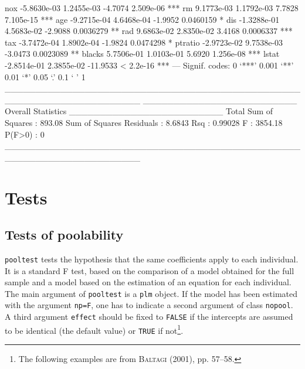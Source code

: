 \documentclass{article}
\begin{document}
\begin{Schunk}
\begin{Soutput}
nox         -5.8630e-03  1.2455e-03  -4.7074 2.509e-06 ***
rm           9.1773e-03  1.1792e-03   7.7828 7.105e-15 ***
age         -9.2715e-04  4.6468e-04  -1.9952 0.0460159 *  
dis         -1.3288e-01  4.5683e-02  -2.9088 0.0036279 ** 
rad          9.6863e-02  2.8350e-02   3.4168 0.0006337 ***
tax         -3.7472e-04  1.8902e-04  -1.9824 0.0474298 *  
ptratio     -2.9723e-02  9.7538e-03  -3.0473 0.0023089 ** 
blacks       5.7506e-01  1.0103e-01   5.6920 1.256e-08 ***
lstat       -2.8514e-01  2.3855e-02 -11.9533 < 2.2e-16 ***
---
Signif. codes:  0 ‘***’ 0.001 ‘**’ 0.01 ‘*’ 0.05 ‘.’ 0.1 ‘ ’ 1 
______________________________________________________________________ 
_________________________ Overall Statistics _________________________
Total Sum of Squares       : 893.08
Sum of Squares Residuals   : 8.6843
Rsq                        : 0.99028
F                          : 3854.18
P(F>0)                     : 0
______________________________________________________________________ 
\end{Soutput}
\end{Schunk}
\section{Tests}


\subsection{Tests of poolability}

\texttt{pooltest} tests the hypothesis that the same coefficients
apply to each individual. It is a standard F test, based on the
comparison of a model obtained for the full sample and a model based
on the estimation of an equation for each individual. The main
argument of \texttt{pooltest} is a \texttt{plm} object. If the model
has been estimated with the argument  \texttt{np=F}, one has to
indicate a second argument of class  \texttt{nopool}.
A third argument  \texttt{effect} should be fixed to \texttt{FALSE} if
the intercepts are assumed to be identical (the default value) or \texttt{TRUE} if
not\footnote{The following examples are from 
  \textsc{Baltagi} (2001), pp. 57--58.}.
\end{document}
